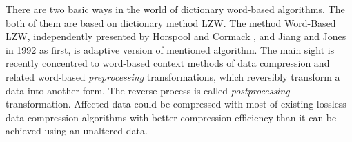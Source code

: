 \begin{introduction}
	There are two basic ways in the world of dictionary word-based algorithms. The both of them are based on dictionary method \gls{LZW}. The method Word-Based \gls{LZW}, independently presented by Horspool and Cormack \cite{HC92}, and Jiang and Jones \cite{JJ92} in 1992 as first, is adaptive version of mentioned algorithm. The main sight is recently concentred to word-based context methods of data compression and related word-based \textit{preprocessing} transformations, which reversibly transform a data into another form. The reverse process is called \textit{postprocessing} transformation. Affected data could be compressed with most of existing lossless data compression algorithms with better compression efficiency than it can be achieved using an unaltered data. 
\end{introduction}